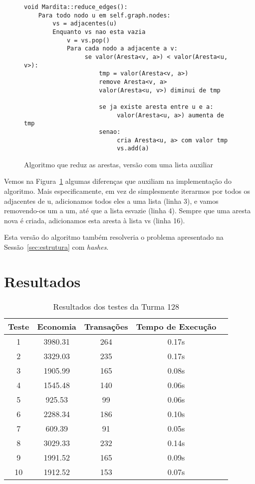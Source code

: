 \documentclass[12pt]{article}
\begin{document}
\begin{figure}[htb!]
  \centering
\begin{lstlisting}
void Mardita::reduce_edges():
    Para todo nodo u em self.graph.nodes:
        vs = adjacentes(u)
        Enquanto vs nao esta vazia
            v = vs.pop()
            Para cada nodo a adjacente a v:
                 se valor(Aresta<v, a>) < valor(Aresta<u, v>):
                     tmp = valor(Aresta<v, a>)
                     remove Aresta<v, a>
                     valor(Aresta<u, v>) diminui de tmp

                     se ja existe aresta entre u e a:
                          valor(Aresta<u, a>) aumenta de tmp
                     senao:
                          cria Aresta<u, a> com valor tmp
                          vs.add(a)
\end{lstlisting}
  \caption{Algoritmo que reduz as arestas, versão com uma lista auxiliar}
\label{fig:algoritmo:reduce_edges:push_pop}
\end{figure}

Vemos na Figura~\ref{fig:algoritmo:reduce_edges:push_pop} algumas diferenças que
auxiliam na implementação do algoritmo. Mais especificamente, em vez de
simplesmente iterarmos por todos os adjacentes de \textsf{u}, adicionamos todos
eles a uma lista (linha 3), e vamos removendo-os um a um, até que a lista
esvazie (linha 4). Sempre que uma aresta nova é criada, adicionamos esta aresta
à lista \textsf{vs} (linha 16).

Esta versão do algoritmo também resolveria o problema apresentado na
Sessão~\ref{sec:estrutura} com \textit{hashes}.

\section{Resultados}\label{sec:resultados}

\begin{table}[H]
  \centering
\begin{tabular}{||c|c||c|c|c||}
  \hline
Teste & Economia & Transações & Tempo de Execução \\ [0.5ex]
  \hline\hline
  1 & 3980.31 & 264 & 0.17s \\
  \hline
  2 & 3329.03 & 235 & 0.17s \\
  \hline
  3 & 1905.99 & 165 & 0.08s \\
  \hline
  4 & 1545.48 & 140 & 0.06s \\
  \hline
  5 & 925.53  & 99 & 0.06s \\
  \hline
  6 & 2288.34 & 186 & 0.10s \\
  \hline
  7 & 609.39  & 91 & 0.05s \\
  \hline
  8 & 3029.33 & 232 & 0.14s \\
  \hline
  9 & 1991.52 & 165 & 0.09s \\
  \hline
  10 & 1912.52 & 153 & 0.07s \\
\hline
\end{tabular}

\caption{Resultados dos testes da Turma 128}
\end{table}
\end{document}
